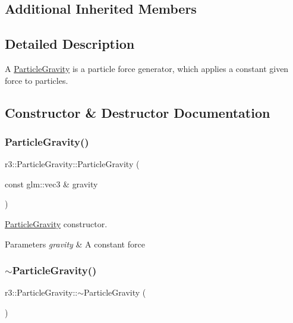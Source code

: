 \subsection*{Additional Inherited Members}


\subsection{Detailed Description}
A \mbox{\hyperlink{classr3_1_1_particle_gravity}{Particle\+Gravity}} is a particle force generator, which applies a constant given force to particles. 

\subsection{Constructor \& Destructor Documentation}
\mbox{\label{classr3_1_1_particle_gravity_a698440df6351766d4c5c3c7704bdead6}} 
\subsubsection{\texorpdfstring{Particle\+Gravity()}{ParticleGravity()}}
{\footnotesize\ttfamily r3\+::\+Particle\+Gravity\+::\+Particle\+Gravity (\begin{DoxyParamCaption}\item[{const glm\+::vec3 \&}]{gravity }\end{DoxyParamCaption})\hspace{0.3cm}{\ttfamily [explicit]}}



\mbox{\hyperlink{classr3_1_1_particle_gravity}{Particle\+Gravity}} constructor. 


\begin{DoxyParams}{Parameters}
{\em gravity} & A constant force \\
\hline
\end{DoxyParams}
\mbox{\label{classr3_1_1_particle_gravity_a7130786765cc4befe6808a70254871bc}} 
\subsubsection{\texorpdfstring{$\sim$\+Particle\+Gravity()}{~ParticleGravity()}}
{\footnotesize\ttfamily r3\+::\+Particle\+Gravity\+::$\sim$\+Particle\+Gravity (\begin{DoxyParamCaption}{ }\end{DoxyParamCaption})\hspace{0.3cm}{\ttfamily [default]}}



